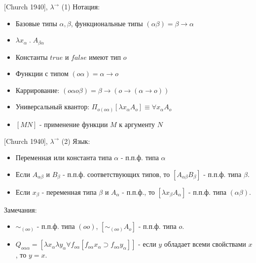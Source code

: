 \documentclass{beamer}
\begin{document}
\begin{frame}{[Church 1940], $\lambda^\to$ (1)}
Нотация:\\
\bigskip
\begin{itemize}
  \item Базовые типы $\alpha, \beta$, функциональные типы $(\alpha\beta) = \beta \to \alpha$
  \item $\lambda x_\alpha \; . \; A_{\beta\alpha}$
  \item Константы $true$ и $false$ имеют тип $o$
  \item Функции с типом $(o\alpha) = \alpha \to o$
  \item Каррирование: $(o\alpha o\beta) = \beta \to (o \to (\alpha \to o))$
  \item Универсальный квантор: $\Pi_{o(o\alpha)}[\lambda x_\alpha A_o] \equiv \forall x_\alpha A_o$
  \item $[MN]$ - применение функции $M$ к аргументу $N$
\end{itemize}
\end{frame}

\begin{frame}{[Church 1940], $\lambda^\to$ (2)}
Язык:\\
\bigskip
\begin{itemize}
  \item Переменная или константа типа $\alpha$ - п.п.ф. типа $\alpha$ 
  \item Если $A_{\alpha\beta}$ и $B_{\beta}$ - п.п.ф. соответствующих типов, то $[A_{\alpha\beta}B_\beta]$ - п.п.ф. типа $\beta$.
  \item Если $x_\beta$ - переменная типа $\beta$ и $A_\alpha$ - п.п.ф., то $[\lambda x_\beta A_\alpha]$ - п.п.ф. типа $(\alpha \beta)$.
\end{itemize}
\bigskip
Замечания:\\
\begin{itemize}
  \item $\sim_{(oo)}$ - п.п.ф. типа $(oo)$, $[\sim_{(oo)}A_o]$ - п.п.ф. типа $o$.
  \item $Q_{o \alpha \alpha} = [\lambda x_\alpha \lambda y_\alpha \forall f_{o \alpha}[f_{o \alpha} x_\alpha \supset f_{o \alpha} y_\alpha]]$ - если $y$ обладает всеми свойствами $x$, то $y = x$.
\end{itemize}
\end{frame}
\end{document}
